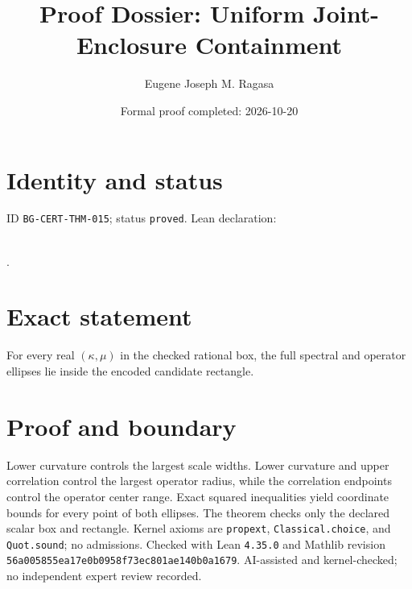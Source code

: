 \documentclass[11pt]{article}
\title{Proof Dossier: Uniform Joint-Enclosure Containment}\author{Eugene Joseph M. Ragasa}\date{Formal proof completed: 2026-10-20}
\begin{document}
\maketitle
\section{Identity and status}
ID \texttt{BG-CERT-THM-015}; status \texttt{proved}. Lean declaration:
\par{}\\
{\tiny{}}.
\section{Exact statement}
For every real $(\kappa,\mu)$ in the checked rational box, the full spectral and operator
ellipses lie inside the encoded candidate rectangle.
\section{Proof and boundary}
Lower curvature controls the largest scale widths. Lower curvature and upper correlation
control the largest operator radius, while the correlation endpoints control the operator
center range. Exact squared inequalities yield coordinate bounds for every point of both
ellipses. The theorem checks only the declared scalar box and rectangle. Kernel axioms are
\texttt{propext}, \texttt{Classical.choice}, and \texttt{Quot.sound}; no admissions.
Checked with Lean \texttt{4.35.0} and Mathlib revision
\texttt{56a005855ea17e0b0958f73ec801ae140b0a1679}. AI-assisted and kernel-checked;
no independent expert review recorded.
\end{document}
